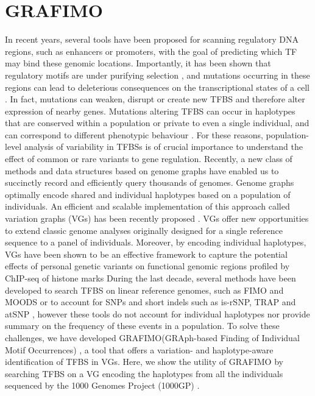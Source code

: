 \documentclass[a4paper, titlepage, openright]{book}
\newcommand{\grafimo}{GRAFIMO\xspace}
\begin{document}
\section{GRAFIMO}
In recent years, several tools have been proposed for scanning regulatory DNA regions, such as enhancers or promoters, with the goal of predicting which TF may bind these genomic locations. Importantly, it has been shown that regulatory motifs are under purifying selection \citep{li2015human,  vorontsov2016negative}, and mutations occurring in these regions can lead to deleterious consequences on the transcriptional states of a cell \citep{guo2018mutation}. In fact, mutations can weaken, disrupt or create new TFBS and therefore alter expression of nearby genes. Mutations altering TFBS can occur in haplotypes that are conserved within a population or private to even a single individual, and can correspond to different phenotypic behaviour \citep{kasowski2010variation}. For these reasons, population-level analysis of variability in TFBSs is of crucial importance to understand the effect of common or rare variants to gene regulation. Recently, a new class of methods and data structures based on genome graphs have enabled us to succinctly record and efficiently query thousands of genomes.  Genome graphs optimally encode shared and individual haplotypes based on a population of individuals. An efficient and scalable implementation of this approach called variation graphs (VGs) has been recently proposed \citep{garrison2018variation}.  VGs offer new opportunities to extend classic genome analyses originally designed for a single reference sequence to a panel of individuals. Moreover, by encoding individual haplotypes, VGs have been shown to be an effective framework to capture the potential effects of personal genetic variants on functional genomic regions profiled by ChIP-seq of histone marks \citep{groza2020personalized} During the last decade, several methods have been developed to search TFBS on linear reference genomes, such as FIMO \citep{grant2011fimo} and MOODS \citep{korhonen2009moods} or to account for SNPs and short indels such as is-rSNP, TRAP and atSNP \citep{macintyre2010rsnp, thomas2011transcription, zuo2015atsnp}, however these tools do not account for individual haplotypes nor provide summary on the frequency of these events in a population. To solve these challenges, we have developed \grafimo (GRAph-based Finding of Individual Motif Occurrences) \citep{tognon2021grafimo}, a tool that offers a variation- and haplotype-aware identification of TFBS in VGs. Here, we show the utility of \grafimo by searching TFBS on a VG encoding the haplotypes from all the individuals sequenced by the 1000 Genomes Project (1000GP) \citep{siva20081000, zheng2017alignment}.
\end{document}
